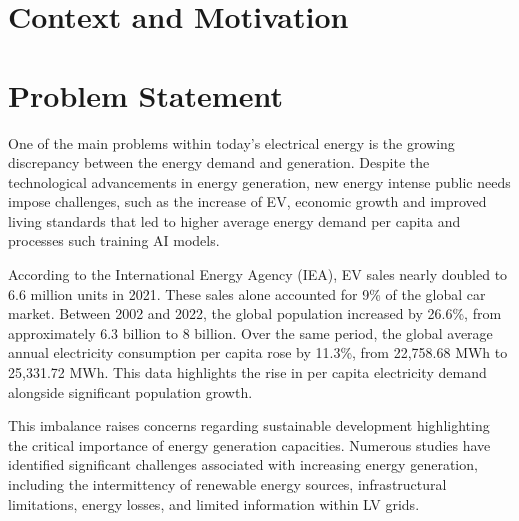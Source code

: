 \cleardoublepage
\label{chap:1intro}

\section{Context and Motivation}



\section{Problem Statement}

One of the main problems within today’s electrical energy is the growing discrepancy between the energy demand and generation. Despite the technological advancements in energy generation, new energy intense public needs impose challenges, such as the increase of \ac{EV}\cite{iea2022}, economic growth and improved living standards that led to higher average energy demand per capita\cite{owid-energy-access, ember2024electricity} and processes such training AI models.

According to the International Energy Agency (IEA), \ac{EV} sales nearly doubled to 6.6 million units in 2021. These sales alone accounted for 9\% of the global car market\cite{iea2022}. Between 2002 and 2022, the global population increased by 26.6\%, from approximately 6.3 billion to 8 billion\cite{un_population_2024}. Over the same period, the global average annual electricity consumption per capita rose by 11.3\%, from 22,758.68 MWh to 25,331.72 MWh\cite{owid-energy-access, ember2024electricity}. This data highlights the rise in per capita electricity demand alongside significant population growth.

This imbalance raises concerns regarding sustainable development highlighting the critical importance of energy generation capacities. Numerous studies have identified significant challenges associated with increasing energy generation, including the intermittency of renewable energy sources, infrastructural limitations, energy losses, and limited information within \ac{LV} grids\cite{abideen_ReviewToolsMethods, pcarvalho2024lecture}.



